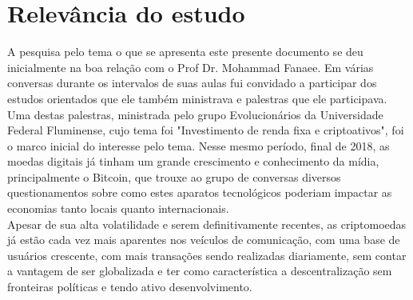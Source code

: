 \section{Relevância do estudo}

A pesquisa pelo tema o que se apresenta este presente documento se deu inicialmente na boa relação com o Prof Dr. Mohammad Fanaee. Em várias conversas durante os intervalos de suas aulas fui convidado a participar dos estudos orientados que ele também ministrava e palestras que ele participava. Uma destas palestras, ministrada pelo grupo  Evolucionários da Universidade Federal Fluminense, cujo tema foi "Investimento de renda fixa e criptoativos", foi o marco inicial do interesse pelo tema. Nesse mesmo período, final de 2018, as moedas digitais já tinham um grande crescimento e conhecimento da mídia, principalmente o Bitcoin, que trouxe ao grupo de conversas diversos questionamentos sobre como estes aparatos tecnológicos poderiam impactar as economias tanto locais quanto internacionais. \\
Apesar de sua alta volatilidade e serem definitivamente recentes, as criptomoedas já estão cada vez mais aparentes nos veículos de comunicação, com uma base de usuários crescente, com mais transações sendo realizadas diariamente, sem contar a vantagem de ser globalizada e ter como característica a descentralização sem fronteiras políticas e tendo ativo desenvolvimento. 

 